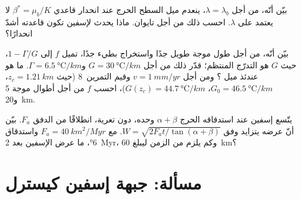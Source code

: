 \begin{exercise}[$\star\star\star$]\label{exo:b3:orogenic-wedges:10}
بيّن أنّه، من أجل $\lambda = \lambda_b$، ينعدم ميل السطح الحرج عند
انحدار قاعدي $\beta^* = \mu_b/K$ لا يعتمد على $\lambda$. احسب ذلك من أجل
تايوان. ماذا يحدث لإسفين تكون قاعدته أشدّ انحدارًا؟
\end{exercise}

\begin{exercise}[$\star\star\star$]\label{exo:b3:orogenic-wedges:11}
بيّن أنّه، من أجل طول موجة طويل جدًا واستخراج بطيء جدًا، تميل $f$ إلى
$1 - \Gamma/G$، حيث $G$ هو التدرّج المنتظم؛ قدّر ذلك من أجل $G =
\qty{30}{\celsius/km}$ و$\Gamma = \qty{6.5}{\celsius/km}$. ما هو عندئذ
ميل ؟ ومن أجل $v = \qty{1}{mm/yr}$ وقيم
التمرين~8 (حيث $z_c = \qty{1.21}{km}$، $G_0 = \qty{46.5}{\celsius/km}$،
$G(z_c) = \qty{44.7}{\celsius/km}$)، احسب $f$ من أجل أطوال موجة 5
و\qty{20}{km}.
\end{exercise}

\begin{exercise}[$\star\star\star$]\label{exo:b3:orogenic-wedges:12}
يتّسع إسفين عند استدقاقه الحرج $\alpha + \beta$  وحده، دون
تعرية، انطلاقًا من الدفق $F_a$. بيّن أنّ عرضه يتزايد وفق
$W = \sqrt{2F_at/\tan(\alpha + \beta)}$. مع $F_a = \qty{40}{km^2/Myr}$ واستدقاق \ang{6}،
ما عرض الإسفين بعد \qty{2}{Myr}، وكم يلزم من الزمن ليبلغ
\qty{60}{km}؟
\end{exercise}

\section{مسألة: جبهة إسفين كيسترل}

